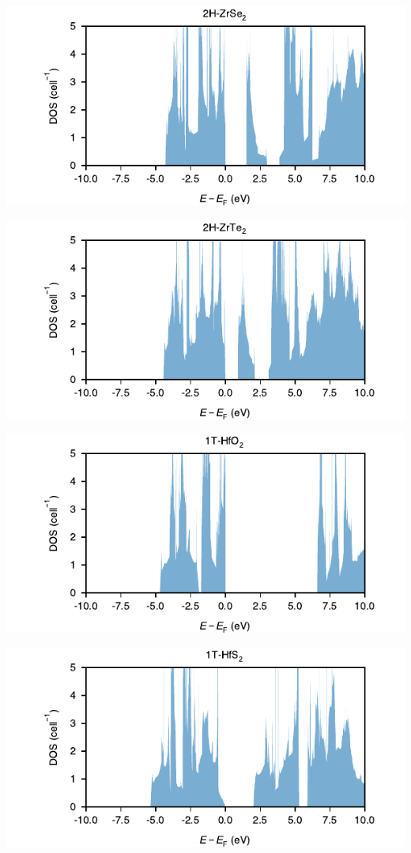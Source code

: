 \begin{center}
\includegraphics[width=.9\linewidth]{img/SI_figs/2H-ZrSe2-DOS.pdf}
\end{center}
\begin{center}
\includegraphics[width=.9\linewidth]{img/SI_figs/2H-ZrTe2-DOS.pdf}
\end{center}
\begin{center}
\includegraphics[width=.9\linewidth]{img/SI_figs/1T-HfO2-DOS.pdf}
\end{center}
\begin{center}
\includegraphics[width=.9\linewidth]{img/SI_figs/1T-HfS2-DOS.pdf}
\end{center}
